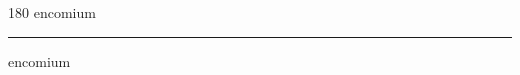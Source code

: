 
\begin{frame}
\begin{center}
\begin{turn}{180}
{\fontsize{2.5cm}{1em}\selectfont encomium}
\end{turn}
\vspace{1em}\par  
\hrule
\vspace{1em}\par  
{\fontsize{2.5cm}{1em}\selectfont encomium}
\end{center}
\end{frame}
